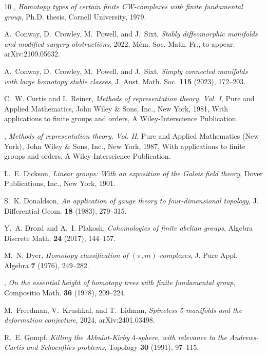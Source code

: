 \documentclass[11pt,a4paper,leqno]{amsart}
\theoremstyle{definition}
\theoremstyle{remark}
\begin{document}
\begin{thebibliography}{10}
\bysame, \emph{Homotopy types of certain finite {CW}-complexes with finite
  fundamental group}, Ph.D. thesis, Cornell University, 1979.

A.~Conway, D.~Crowley, M.~Powell, and J.~Sixt, \emph{Stably diffeomorphic
  manifolds and modified surgery obstructions}, 2022, M\'{e}m. Soc. Math. Fr.,
  to appear. arXiv:2109.05632.

A.~Conway, D.~Crowley, M.~Powell, and J.~Sixt, \emph{Simply connected manifolds
  with large homotopy stable classes}, J. Aust. Math. Soc. \textbf{115} (2023),
  172--203.

C.~W. Curtis and I.~Reiner, \emph{Methods of representation theory. {V}ol.
  {I}}, Pure and Applied Mathematics, John Wiley \& Sons, Inc., New York, 1981,
  With applications to finite groups and orders, A Wiley-Interscience
  Publication.

\bysame, \emph{Methods of representation theory. {V}ol. {II}}, Pure and Applied
  Mathematics (New York), John Wiley \& Sons, Inc., New York, 1987, With
  applications to finite groups and orders, A Wiley-Interscience Publication.

L.~E. Dickson, \emph{Linear groups: {W}ith an exposition of the {G}alois field
  theory}, Dover Publications, Inc., New York, 1901.

S.~K. Donaldson, \emph{An application of gauge theory to four-dimensional
  topology}, J. Differential Geom. \textbf{18} (1983), 279--315.

Y.~A. Drozd and A.~I. Plakosh, \emph{Cohomologies of finite abelian groups},
  Algebra Discrete Math. \textbf{24} (2017), 144--157.

M.~N. Dyer, \emph{Homotopy classification of {$(\pi , m)$}-complexes}, J. Pure
  Appl. Algebra \textbf{7} (1976), 249--282.

\bysame, \emph{On the essential height of homotopy trees with finite
  fundamental group}, Compositio Math. \textbf{36} (1978), 209--224.

M.~Freedman, V.~Krushkal, and T.~Lidman, \emph{Spineless 5-manifolds and the
  deformation conjecture}, 2024, arXiv:2401.03498.

R.~E. Gompf, \emph{Killing the {A}kbulut-{K}irby {$4$}-sphere, with relevance
  to the {A}ndrews-{C}urtis and {S}choenflies problems}, Topology \textbf{30}
  (1991), 97--115.


\end{thebibliography}
\end{document}
